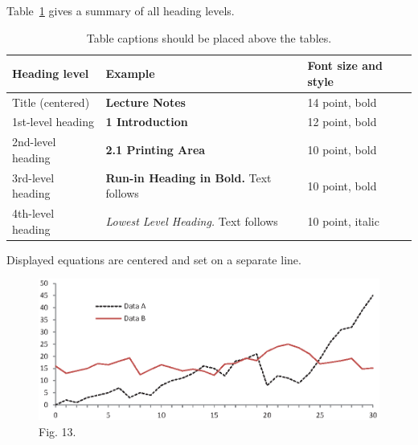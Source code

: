 \documentclass[runningheads]{llncs}
\begin{document}
Table~\ref{tab1} gives a summary of all heading levels.
\begin{table}
\caption{Table captions should be placed above the
tables.}\label{tab1}
\begin{tabular}{|l|l|l|}
\hline
Heading level &  Example & Font size and style\\
\hline
Title (centered) &  {\Large\bfseries Lecture Notes} & 14 point, bold\\
1st-level heading &  {\large\bfseries 1 Introduction} & 12 point, bold\\
2nd-level heading & {\bfseries 2.1 Printing Area} & 10 point, bold\\
3rd-level heading & {\bfseries Run-in Heading in Bold.} Text follows & 10 point, bold\\
4th-level heading & {\itshape Lowest Level Heading.} Text follows & 10 point, italic\\
\hline
\end{tabular}
\end{table}

\noindent Displayed equations are centered and set on a separate line.
\begin{figure}
\includegraphics[width=\textwidth]{fig1.eps}
\caption{Fig. 13.} \label{fig13}
\end{figure}


\end{document}
